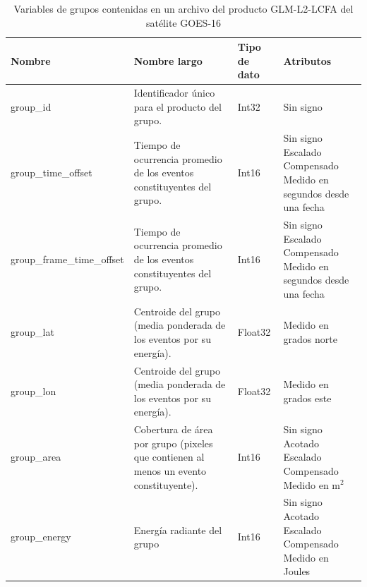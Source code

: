 \begin{table}[H]
  \centering
  \small
  \label{tab:vars_groups_glm}
  \caption{
    Variables de grupos contenidas en un archivo del producto GLM-L2-LCFA del 
    satélite GOES-16
  }
  \begin{tabular}{l|p{3cm}|p{1.15cm}|p{3.5cm}}
    \textbf{Nombre} & 
    \textbf{Nombre largo} & 
    \textbf{Tipo de dato} & 
    \textbf{Atributos} \\ \hline

    group\_id &
    Identificador único para el producto del grupo.&
    Int32 &
    \parbox[t]{3.5cm}{Sin signo}\\ \hline

    group\_time\_offset &
    Tiempo de ocurrencia promedio de los eventos constituyentes del grupo.&
    Int16 &
    \parbox[t]{3.5cm}{Sin signo \\ Escalado \\ Compensado \\ Medido en segundos desde una fecha}\\ \hline

    group\_frame\_time\_offset &
    Tiempo de ocurrencia promedio de los eventos constituyentes del grupo.&
    Int16 &
    \parbox[t]{3.5cm}{Sin signo \\ Escalado \\ Compensado \\ Medido en segundos desde una fecha}\\ \hline

    group\_lat &
    Centroide del grupo (media ponderada de los eventos por su energía).&
    Float32 &
    \parbox[t]{3.5cm}{Medido en grados norte}\\ \hline

    group\_lon &
    Centroide del grupo (media ponderada de los eventos por su energía).&
    Float32 &
    \parbox[t]{3.5cm}{Medido en grados este}\\ \hline

    group\_area &
    Cobertura de área por grupo (pixeles que contienen al menos un evento constituyente).&
    Int16 &
    \parbox[t]{3.5cm}{Sin signo \\ Acotado \\ Escalado \\ Compensado \\ Medido en m$^2$}\\ \hline

    group\_energy &
    Energía radiante del grupo&
    Int16 &
    \parbox[t]{3.5cm}{Sin signo \\ Acotado \\ Escalado \\ Compensado \\ Medido en Joules}\\ \hline


\end{tabular}
\end{table}

